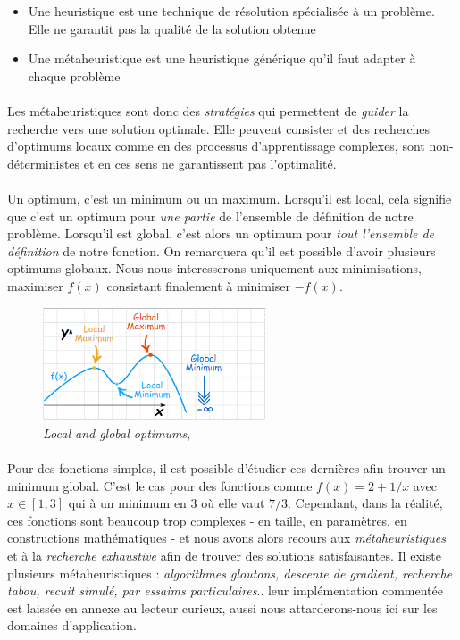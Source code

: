 \begin{itemize}
    \item Une heuristique est une technique de résolution spécialisée à un problème. Elle ne garantit pas la qualité de
    la solution obtenue
    \item Une métaheuristique est une heuristique générique qu’il faut adapter à chaque problème
\end{itemize}

\paragraph{} Les métaheuristiques sont donc des \emph{stratégies} qui permettent de \emph{guider} la recherche vers une
solution optimale. Elle peuvent consister et des recherches d'optimums locaux comme en des processus d'apprentissage complexes,
sont non-déterministes et en ces sens ne garantissent pas l'optimalité.

\paragraph{} Un optimum, c'est un minimum ou un maximum. Lorsqu'il est local, cela signifie que c'est un optimum pour \emph{une
partie} de l'ensemble de définition de notre problème. Lorsqu'il est global, c'est alors un optimum pour \emph{tout l'ensemble
de définition} de notre fonction. On remarquera qu'il est possible d'avoir plusieurs optimums globaux. Nous nous interesserons 
uniquement aux minimisations, maximiser $f(x)$ consistant finalement à minimiser $-f(x)$.

\begin{figure}[h]
    \centering
    \includegraphics[width=250px]{chapters/03/images/optimums.png}
    \caption{\label{optimums} \emph{Local and global optimums}, \cite{Optimums0}}
\end{figure}

\paragraph{} Pour des fonctions simples, il est possible d'étudier ces dernières afin trouver un minimum global.
C'est le cas pour des fonctions comme $f(x) = 2 + 1/x$ avec $x \in [1, 3]$ qui à un minimum en 3 où elle vaut $7/3$.
Cependant, dans la réalité, ces fonctions sont beaucoup trop complexes - en taille, en paramètres, en constructions
mathématiques - et nous avons alors recours aux \emph{métaheuristiques} et à la \emph{recherche exhaustive} afin
de trouver des solutions satisfaisantes. Il existe plusieurs métaheuristiques : \emph{algorithmes gloutons, descente
de gradient, recherche tabou, recuit simulé, par essaims particulaires}.. leur implémentation commentée est laissée
en annexe au lecteur curieux, aussi nous attarderons-nous ici sur les domaines d'application.

